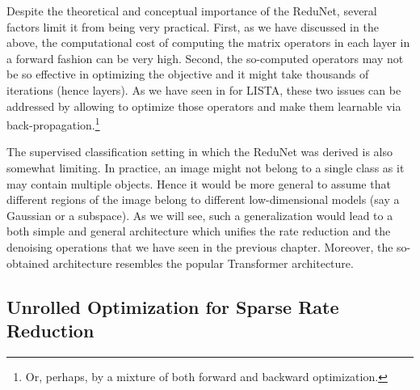 \documentclass[../../book-main.tex]{subfiles}
\begin{document}
Despite the theoretical and conceptual importance of the ReduNet, several factors limit it from being very practical. First, as we have discussed in the above, the computational cost of computing the matrix operators in  each layer in a forward fashion can be very high. Second, the so-computed operators may not be so effective in optimizing the objective and it might take thousands of iterations (hence layers). As we have seen  in  for LISTA, these two issues can be addressed by allowing to optimize those operators and make them learnable via back-propagation.\footnote{Or, perhaps, by a mixture of both forward and backward optimization.}

The supervised classification setting in which the ReduNet was derived is also somewhat limiting. In practice, an image might not belong to a single class as it may contain multiple objects. Hence it would be more general to assume that different regions of the image belong to  different low-dimensional models (say a Gaussian or a subspace). As we will see, such a generalization would lead to a both simple and general architecture which unifies the rate reduction and the denoising operations that we have seen in the previous chapter. Moreover, the so-obtained architecture resembles the popular Transformer architecture.



\subsection{Unrolled Optimization for Sparse Rate Reduction}

\end{document}

